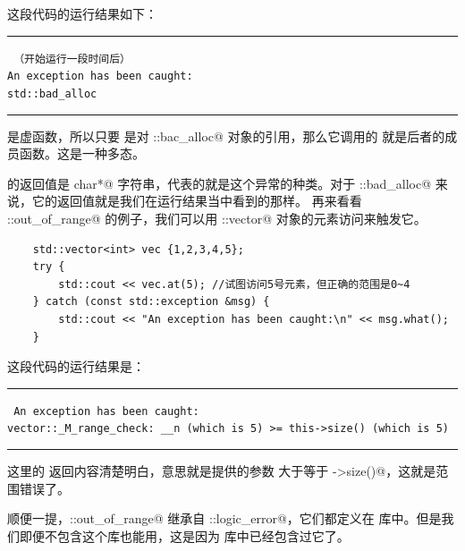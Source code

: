 这段代码的运行结果如下：\\\noindent\rule{\linewidth}{.2pt}\texttt{
{\kaishu （开始运行一段时间后）}\\
An exception has been caught:\\
std::bad\_alloc
}\\\noindent\rule{\linewidth}{.2pt}\par
\lstinline@what@ 是虚函数，所以只要 \lstinline@msg@ 是对 \lstinline@std::bac_alloc@ 对象的引用，那么它调用的 \lstinline@what@ 就是后者的成员函数。这是一种多态。\par
\lstinline@what@ 的返回值是 \lstinline@const char*@ 字符串，代表的就是这个异常的种类。对于 \lstinline@std::bad_alloc@ 来说，它的返回值就是我们在运行结果当中看到的那样。
再来看看 \lstinline@std::out_of_range@ 的例子，我们可以用 \lstinline@std::vector@ 对象的元素访问来触发它。
\begin{lstlisting}
    std::vector<int> vec {1,2,3,4,5};
    try {
        std::cout << vec.at(5); //试图访问5号元素，但正确的范围是0~4
    } catch (const std::exception &msg) {
        std::cout << "An exception has been caught:\n" << msg.what();
    }
\end{lstlisting}
这段代码的运行结果是：\\\noindent\rule{\linewidth}{.2pt}\texttt{
An exception has been caught:\\
vector::\_M\_range\_check: \_\_n (which is 5) >= this->size() (which is 5)
}\\\noindent\rule{\linewidth}{.2pt}\par
这里的 \lstinline@what@ 返回内容清楚明白，意思就是提供的参数 \lstinline@n@ 大于等于 \lstinline@this->size()@，这就是范围错误了。\par
顺便一提，\lstinline@std::out_of_range@ 继承自 \lstinline@std::logic_error@，它们都定义在 \lstinline@stdexcept@ 库中。但是我们即便不包含这个库也能用，这是因为 \lstinline@vector@ 库中已经包含过它了。\par
